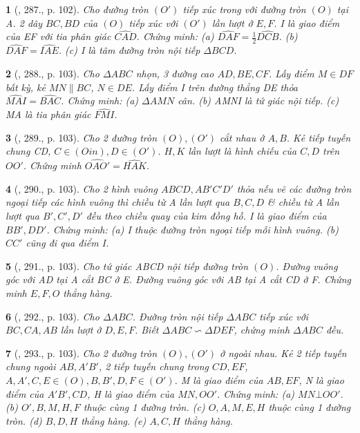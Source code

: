 \documentclass{article}
\newtheorem{baitoan}{}
\begin{document}
\begin{baitoan}[\cite{Binh_Toan_9_tap_2}, 287., p. 102]
	Cho đường tròn $(O')$ tiếp xúc trong với đường tròn $(O)$ tại A. 2 dây $BC,BD$ của $(O)$ tiếp xúc với $(O')$ lần lượt ở $E,F$. I là giao điểm của EF với tia phân giác $\widehat{CAD}$. Chứng minh: (a) $\widehat{DAF} = \frac{1}{2}\widehat{DCB}$. (b) $\widehat{DAF} = \widehat{IAE}$. (c) I là tâm đường tròn nội tiếp $\Delta BCD$.
\end{baitoan}

\begin{baitoan}[\cite{Binh_Toan_9_tap_2}, 288., p. 103]
	Cho $\Delta ABC$ nhọn, 3 đường cao $AD,BE,CF$. Lấy điểm $M\in DF$ bất kỳ, kẻ $MN\parallel BC$, $N\in DE$. Lấy điểm I trên đường thẳng DE thỏa $\widehat{MAI} = \widehat{BAC}$. Chứng minh: (a) $\Delta AMN$ cân. (b) AMNI là tứ giác nội tiếp. (c) MA là tia phân giác $\widehat{FMI}$.
\end{baitoan}

\begin{baitoan}[\cite{Binh_Toan_9_tap_2}, 289., p. 103]
	Cho 2 đường tròn $(O),(O')$ cắt nhau ở $A,B$. Kẻ tiếp tuyến chung CD, $C\in(Oin),D\in(O')$. $H,K$ lần lượt là hình chiếu của $C,D$ trên $OO'$. Chứng minh $\widehat{OAO'} = \widehat{HAK}$.
\end{baitoan}

\begin{baitoan}[\cite{Binh_Toan_9_tap_2}, 290., p. 103]
	Cho 2 hình vuông $ABCD,AB'C'D'$ thỏa nếu vẽ các đường tròn ngoại tiếp các hình vuông thì chiều từ A lần lượt qua $B,C,D$ \& chiều từ A lần lượt qua $B',C',D'$ đều theo chiều quay của kim đồng hồ. I là giao điểm của $BB',DD'$. Chứng minh: (a) I thuộc đường tròn ngoại tiếp mỗi hình vuông. (b) $CC'$ cũng đi qua điểm I.
\end{baitoan}

\begin{baitoan}[\cite{Binh_Toan_9_tap_2}, 291., p. 103]
	Cho tứ giác ABCD nội tiếp đường tròn $(O)$. Đường vuông góc với AD tại A cắt BC ở E. Đường vuông góc với AB tại A cắt CD ở F. Chứng minh $E,F,O$ thẳng hàng.
\end{baitoan}

\begin{baitoan}[\cite{Binh_Toan_9_tap_2}, 292., p. 103]
	Cho $\Delta ABC$. Đường tròn nội tiếp $\Delta ABC$ tiếp xúc với $BC,CA,AB$ lần lượt ở $D,E,F$. Biết $\Delta ABC\backsim\Delta DEF$, chứng minh $\Delta ABC$ đều.
\end{baitoan}

\begin{baitoan}[\cite{Binh_Toan_9_tap_2}, 293., p. 103]
	Cho 2 đường tròn $(O),(O')$ ở ngoài nhau. Kẻ 2 tiếp tuyến chung ngoài $AB,A'B'$, 2 tiếp tuyến chung trong $CD,EF$, $A,A',C,E\in(O),B,B',D,F\in(O')$. M là giao điểm của $AB,EF$, N là giao điểm của $A'B',CD$, H là giao điểm của $MN,OO'$. Chứng minh: (a) $MN\bot OO'$. (b) $O',B,M,H,F$ thuộc cùng 1 đường tròn. (c) $O,A,M,E,H$ thuộc cùng 1 đường tròn. (d) $B,D,H$ thẳng hàng. (e) $A,C,H$ thẳng hàng.
\end{baitoan}
\end{document}
